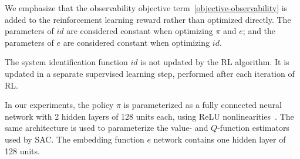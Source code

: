 \documentclass{article}
\newcommand{\TODO}[1]{\textcolor{red}{\textbf{TODO: #1}}}
\newcommand{\embedfn}{e}
\newcommand{\idfn}{id}
\newcommand{\secref}[1]{Section \ref{#1}}
\begin{document}
We emphasize that the observability objective term~\eqref{objective-observability}
is added to the reinforcement learning reward rather than optimized directly.
The parameters of $\idfn$ are considered constant when optimizing $\pi$ and $e$;
and the parameters of $\embedfn$ are considered constant when optimizing $\idfn$.

The system identification function $\idfn$ is not updated by the RL algorithm.
It is updated in a separate supervised learning step, performed after each iteration of RL.

In our experiments,
the policy $\pi$ is parameterized as a fully connected neural network
with 2 hidden layers of 128 units each, using ReLU nonlinearities~\cite{nair-ReLU}.
The same architecture is used to parameterize the value- and $Q$-function estimators used by SAC.
The embedding function $\embedfn$ network contains one hidden layer of 128 units.
\end{document}
